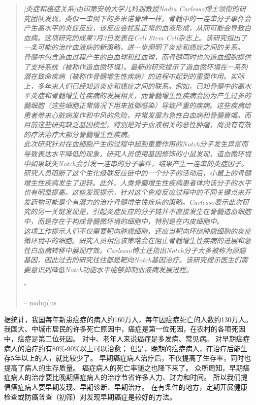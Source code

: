 \documentclass[10pt,a4paper]{article}
\newcommand{\NewsItem}[1]{ %
\usefont{T1}{fvs}{n}{n} %
\vspace{24pt}\large #1\vspace{3pt} %
\par \normalsize \normalfont}
\begin{document}
\begin{multicols}{2}
\begin{quotation}
\noindent\normalsize\textit{[炎症和癌症关系]由印第安纳大学儿科副教授Nadia Carlesso博士领衔的研究团队发现，类似一串倒下的多米诺骨牌一样，骨髓中的一连串分子事件会产生高水平的炎症反应，该反应会扰乱正常的血液形成，从而可能会导致白血病。这项研究的成果7月3日发表在Cell Stem Cell杂志上。该研究指出了一条可能的治疗血液病的新策略，进一步阐明了炎症和癌症之间的关系。\\
骨髓中包含造血过程产生的白血球和红血球，而骨髓同时也为造血细胞提供了支持系统（被称作造血微环境）。最新的研究提示了造血微环境在一系列潜在致命疾病（被称作骨髓增生性疾病）的进程中起到的重要作用。实际上，多年来人们已经知道炎症和癌症之间的联系。例如，已知骨髓中的高水平炎症和骨髓增生性疾病的发展相关，而骨髓增生性疾病会因为产生过多的髓细胞（这些细胞正常情况下用来抵御感染）导致严重的疾病。这些疾病给患者带来心脏病发作和中风的危险，并常发展为急性白血病和骨髓衰竭。而目前这些研究缺乏基因模型，特别是对于血液相关的恶性肿瘤，尚没有有效的疗法治疗大部分骨髓增生性疾病。\\
此次研究针对在血细胞产生的过程中起到重要作用的Notch分子发生异常而导致表达水平降低的现象，研究人员使用基因修饰的小鼠发现，造血微环境中如果缺失Notch会引发一连串的分子事件，结果产生一连串的炎症因子。研究人员阻断了这个生化级联反应链中的一个分子的活动后，小鼠上的骨髓增生性疾病发生了逆转。此外，人类骨髓增生性疾病患者体内该分子的水平也有明显提高。这些发现提示，针对这个免疫反应过程中的不同关键点来开发药物可能是个有潜力的治疗骨髓增生性疾病的策略。Carlesso表示此次研究的另一关键发现是，引起炎症反应的分子链并不直接发生在骨髓造血细胞中，而是存在于构成骨髓微环境的细胞中，特别是在内皮细胞中。\\
这项工作提示人们不仅需要靶向肿瘤细胞，还应当靶向环绕肿瘤细胞的炎症微环境中的细胞。研究人员相信该策略会在阻止骨髓增生性疾病的进展和急性白血病转移中展现疗效。Carlesso博士还指出Notch分子大多被称为原癌基因，因此过去的研究往往都是靶向Notch基因治疗。该研究提示医生们需要意识到降低Notch功能水平能够抑制血液病发展进程。}


\hfill{\Huge''}

\hfill-- molnplus
\end{quotation}


\NewsItem{{\color{hugored}{討論與總結}}}
据统计，我国每年新患癌症的病人约160万人，每年因癌症死亡的人数约130万人。
我国大、中城市居民的许多死亡原因中，癌症是第一位死因，在农村的各项死因中，癌症是第二位死因。
对中、老年人来说癌症是多发病、常见病。
对早期癌症病人的治疗约有80\%-90\%以上可以治愈；
但是，晚期的癌症病人，在治疗后能生存5年以上的人，就比较少了。
早期癌症病人治疗后，不仅提高了生存率，同时也提高了病人的生存质量。
癌症病人的死亡率随之也降下来了。
众所周知，早期癌症病人的治疗要比晚期癌症病人的治疗节省许多人力、财力和时间。
所以我们提倡癌症病人要早期发现、早期诊断、早期治疗。
在有条件的地方，定期开展健康检查或防癌普查（初筛）对发现早期癌症是较好的方法。


\end{multicols}
\end{document}
